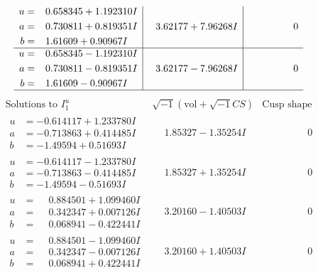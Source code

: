 \documentclass[1p]{elsarticle_modified}
\theoremstyle{definition}
\newcommand{\I}{\sqrt{-1}}
\begin{document}
$$\begin{array}{c|c|c}
\begin{aligned}
u &= \phantom{-}0.658345 + 1.192310 I \\
a &= \phantom{-}0.730811 + 0.819351 I \\
b &= \phantom{-}1.61609 + 0.90967 I\end{aligned}
 & \phantom{-}3.62177 + 7.96268 I & \phantom{-0.000000 } 0 \\ \hline\begin{aligned}
u &= \phantom{-}0.658345 - 1.192310 I \\
a &= \phantom{-}0.730811 - 0.819351 I \\
b &= \phantom{-}1.61609 - 0.90967 I\end{aligned}
 & \phantom{-}3.62177 - 7.96268 I & \phantom{-0.000000 } 0\\
 \hline 
 \end{array}$$\newpage$$\begin{array}{c|c|c}  
\text{Solutions to }I^u_{1}& \I (\text{vol} + \sqrt{-1}CS) & \text{Cusp shape}\\
 \hline 
\begin{aligned}
u &= -0.614117 + 1.233780 I \\
a &= -0.713863 + 0.414485 I \\
b &= -1.49594 + 0.51693 I\end{aligned}
 & \phantom{-}1.85327 - 1.35254 I & \phantom{-0.000000 } 0 \\ \hline\begin{aligned}
u &= -0.614117 - 1.233780 I \\
a &= -0.713863 - 0.414485 I \\
b &= -1.49594 - 0.51693 I\end{aligned}
 & \phantom{-}1.85327 + 1.35254 I & \phantom{-0.000000 } 0 \\ \hline\begin{aligned}
u &= \phantom{-}0.884501 + 1.099460 I \\
a &= \phantom{-}0.342347 + 0.007126 I \\
b &= \phantom{-}0.068941 - 0.422441 I\end{aligned}
 & \phantom{-}3.20160 - 1.40503 I & \phantom{-0.000000 } 0 \\ \hline\begin{aligned}
u &= \phantom{-}0.884501 - 1.099460 I \\
a &= \phantom{-}0.342347 - 0.007126 I \\
b &= \phantom{-}0.068941 + 0.422441 I\end{aligned}
 & \phantom{-}3.20160 + 1.40503 I & \phantom{-0.000000 } 0 \\ \hline\begin{aligned}

\end{aligned}
\end{array}$$
\end{document}
